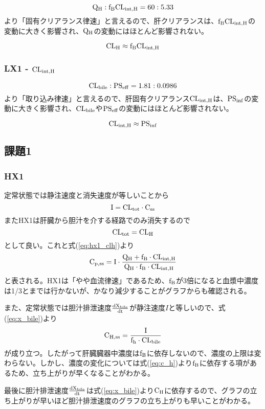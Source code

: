 \documentclass[a4paper,papersize,dvipdfmx]{jsarticle}
\begin{document}
\[\rm Q_H: f_B CL_{int,H}= 60 :5.33\]
より「固有クリアランス律速」と言えるので、肝クリアランスは、$\rm f_B CL_{int,H}$の変動に大きく影響され、$\rm Q_H$の変動にはほとんど影響されない。

\begin{equation}
\rm CL_H \approx f_B CL_{int,H}
\label{eq:lx1_clh}
\end{equation}

\subsubsection*{LX1 - $\rm CL_{int,H}$}
\[\rm CL_{bile}: PS_{eff}= 1.81 :0.0986\]
より「取り込み律速」と言えるので、肝固有クリアランス$\rm CL_{int,H}$は、$\rm PS_{inf}$の変動に大きく影響され、$\rm CL_{bile}$や$\rm PS_{eff}$の変動にはほとんど影響されない。

\begin{equation}
\rm CL_{int,H} \approx  PS_{inf}
\label{eq:lx1_clinth}
\end{equation}

\subsection*{課題1}

\subsubsection*{HX1}

定常状態では静注速度と消失速度が等しいことから
\[\rm I = CL_{tot} \cdot C_{ss}\]
またHX1は肝臓から胆汁を介する経路でのみ消失するので
\[\rm CL_{tot}=CL_H\]
として良い。これと式(\ref{eq:hx1_clh})より
\[\rm C_{p,ss} = I \cdot \frac{Q_H + f_B \cdot CL_{int,H}}{Q_H \cdot f_B \cdot CL_{int,H}}\]
と表される。HX1は「やや血流律速」であるため、$\rm f_B$が3倍になると血漿中濃度は1/3とまでは行かないが、かなり減少することがグラフからも確認される。

また、定常状態では胆汁排泄速度$\rm \frac{dX_{bile}}{dt}$が静注速度$I$と等しいので、式(\ref{eq:x_bile})より
\[\rm C_{H,ss} = \frac{I}{f_h \cdot CL_{bile}}\]
が成り立つ。したがって肝臓臓器中濃度は$\rm f_B$に依存しないので、濃度の上限は変わらない。しかし、濃度の変化については式(\ref{eq:c_h})より$\rm f_B$に依存する項があるため、立ち上がりが早くなることがわかる。

最後に胆汁排泄速度$\rm \frac{dX_{bile}}{dt}$は式(\ref{eq:x_bile})より$\rm C_H$に依存するので、グラフの立ち上がりが早いほど胆汁排泄速度のグラフの立ち上がりも早いことがわかる。
\end{document}
